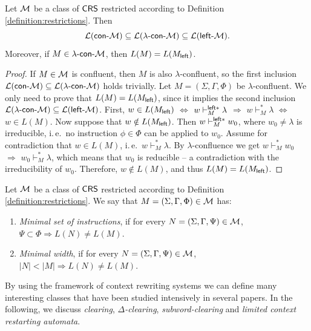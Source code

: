 \begin{lemma}\label{lemma:lambda}
Let $\textup{\sf $\mathcal{M}$}$ be a class of $\textup{\sf CRS\/}$ restricted according to Definition \ref{definition:restrictions}. Then
$${\cal L}(\textup{\sf con-\textup{\sf $\mathcal{M}$}}) \subseteq {\cal L}(\textup{\sf $\lambda$-con-\textup{\sf $\mathcal{M}$}}) \subseteq {\cal L}(\textup{\sf left-\textup{\sf $\mathcal{M}$}}).$$
Moreover, if $M \in \textup{\sf $\lambda$-con-\textup{\sf $\mathcal{M}$}}$, then $L(M) = L(M_{\sf left})$.
\end{lemma}

\begin{proof}
If $M \in \textup{\sf $\mathcal{M}$}$ is confluent, then $M$ is also $\lambda$-confluent, so the first inclusion ${\cal L}(\textup{\sf con-\textup{\sf $\mathcal{M}$}}) \subseteq {\cal L}(\textup{\sf $\lambda$-con-\textup{\sf $\mathcal{M}$}})$ holds trivially. Let $M=(\Sigma, \Gamma, \Phi)$ be $\lambda$-confluent. We only need to prove that $L(M) = L(M_{\sf left})$, since it implies the second inclusion $ {\cal L}(\textup{\sf $\lambda$-con-\textup{\sf $\mathcal{M}$}}) \subseteq {\cal L}(\textup{\sf left-\textup{\sf $\mathcal{M}$}})$. First, $w \in L(M_{\sf left})$ $\Leftrightarrow$ $w \vdash^{{\sf left}*}_M \lambda$ $\Rightarrow$ $w \vdash_M^* \lambda$ $\Leftrightarrow$ $w \in L(M)$. Now suppose that $w \notin L(M_{\sf left})$. Then $w \vdash^{{\sf left}*}_M w_0$, where $w_0 \neq \lambda$ is irreducible, i.\,e.\ no instruction $\phi \in \Phi$ can be applied to $w_0$. Assume for contradiction that $w \in L(M)$, i.\,e.\ $w \vdash_M^* \lambda$. By $\lambda$-confluence we get $w \vdash_M^* w_0$ $\Rightarrow$ $w_0 \vdash_M^* \lambda$, which means that $w_0$ is reducible -- a contradiction with the irreducibility of $w_0$.
Therefore, $w \notin L(M)$, and thus $L(M) = L(M_{\sf left})$.
\end{proof}

\begin{definition}\label{definition:nf}
Let $\textup{\sf $\mathcal{M}$}$ be a class of $\textup{\sf CRS\/}$ restricted according to Definition \ref{definition:restrictions}. We say that $M = (\Sigma, \Gamma, \Phi) \in \textup{\sf $\mathcal{M}$}$ has:
\begin{enumerate}
\item {}\emph{Minimal set of instructions}, if for every $N = (\Sigma, \Gamma, \Psi) \in \textup{\sf $\mathcal{M}$}$, $\Psi \subset \Phi \Rightarrow L(N) \neq L(M)$.
\item {}\emph{Minimal width}, if for every $N = (\Sigma, \Gamma, \Psi) \in \textup{\sf $\mathcal{M}$}$, $|N| < |M| \Rightarrow L(N) \neq L(M)$.
\end{enumerate}
\end{definition}

By using the framework of context rewriting systems we can define many interesting classes that have been studied intensively in several papers. In the following, we discuss \emph{clearing}, \emph{$\Delta$-clearing}, \emph{subword-clearing} and \emph{limited context restarting automata}.

